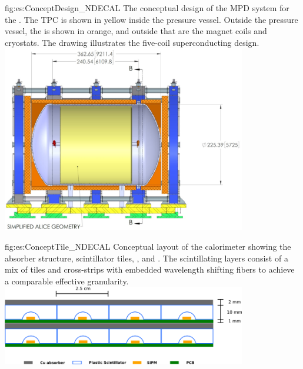\begin{dunefigure}{fig:es:ConceptDesign_NDECAL}
{The conceptual design of the MPD system for the . The TPC is shown in yellow inside the pressure vessel.  Outside the pressure vessel, the  is shown in orange, and outside that are the magnet coils and cryostats.  The drawing illustrates the five-coil superconducting design.}
\includegraphics[width=0.8\textwidth]{graphics/MPDdrawing.jpg}
\end{dunefigure}

\begin{dunefigure}{fig:es:ConceptTile_NDECAL}
{Conceptual layout of the calorimeter showing the absorber structure, scintillator tiles, , and . The scintillating layers consist of a mix of tiles and cross-strips with embedded wavelength shifting fibers to achieve a comparable effective granularity.}
\includegraphics[width=0.8\textwidth]{graphics/TileConcept.png}
\end{dunefigure}

